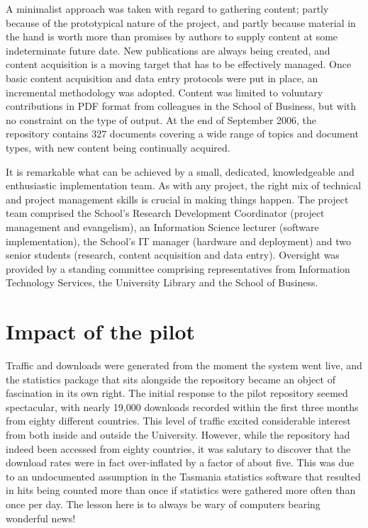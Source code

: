 \documentclass[12pt,pdftex,a4paper,titlepage]{article}
\begin{document}
A minimalist approach was taken with regard to gathering content; partly because of the prototypical nature of the project, and partly because material in the hand is worth more than promises by authors to supply content at some indeterminate future date. New publications are always being created, and content acquisition is a moving target that has to be effectively managed. Once basic content acquisition and data entry protocols were put in place, an incremental methodology was adopted. Content was limited to voluntary contributions in PDF format from colleagues in the School of Business, but with no constraint on the type of output. At the end of September 2006, the repository contains 327 documents covering a wide range of topics and document types, with new content being continually acquired.

It is remarkable what can be achieved by a small, dedicated, knowledgeable and enthusiastic implementation team. As with any project, the right mix of technical and project management skills is crucial in making things happen. The project team comprised the School's Research Development Coordinator (project management and evangelism), an Information Science lecturer (software implementation), the School's IT manager (hardware and deployment) and two senior students (research, content acquisition and data entry). Oversight was provided by a standing committee comprising representatives from Information Technology Services, the University Library and the School of Business.


\section{Impact of the pilot}

Traffic and downloads were generated from the moment the system went live, and the statistics package that sits alongside the repository became an object of fascination in its own right. The initial response to the pilot repository seemed spectacular, with nearly 19,000 downloads recorded within the first three months from eighty different countries. This level of traffic excited considerable interest from both inside and outside the University. However, while the repository had indeed been accessed from eighty countries, it was salutary to discover that the download rates were in fact over-inflated by a factor of about five. This was due to an undocumented assumption in the Tasmania statistics software \cite{Sale-A-2006-stats} that resulted in hits being counted more than once if statistics were gathered more often than once per day. The lesson here is to always be wary of computers bearing wonderful news!
\end{document}
